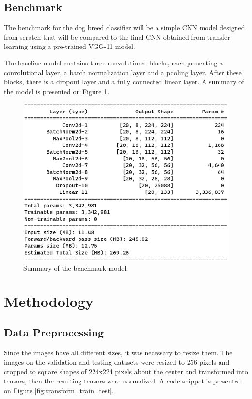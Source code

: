 \documentclass{article}
\begin{document}
    \subsection{Benchmark}
    
    The benchmark for the dog breed classifier will be a simple CNN model designed from scratch that will be compared to the final CNN obtained from transfer learning using a pre-trained VGG-11 model.
    
    The baseline model contains three convolutional blocks, each presenting a convolutional layer, a batch normalization layer and a pooling layer. After these blocks, there is a dropout layer and a fully connected linear layer. A summary of the model is presented on Figure \ref*{fig:model_summary}.
    
    \begin{figure}[htbp]
        \centering
        \includegraphics{img/model_summary.png}
        \caption{Summary of the benchmark model.}
        \label{fig:model_summary}
    \end{figure}
    
    \section{Methodology}

    \subsection{Data Preprocessing}

    Since the images have all different sizes, it was necessary to resize them. The images on the validation and testing datasets were resized to 256 pixels and cropped to square shapes of 224x224 pixels about the center and transformed into tensors, then the resulting tensors were normalized. A code snippet is presented on Figure \ref*{fig:transform_train_test}.
\end{document}
